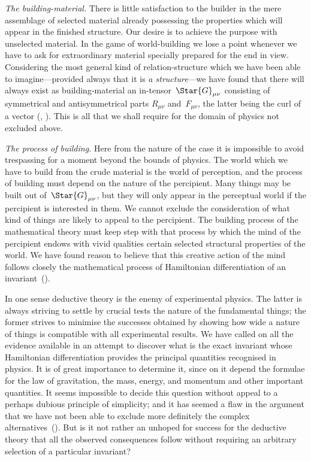 \documentclass[12pt]{book}
\begin{document}
\emph{The building-material.} There is little satisfaction to the builder in the
mere assemblage of selected material already possessing the properties which
will appear in the finished structure. Our desire is to achieve the purpose with
unselected material. In the game of world-building we lose a point whenever
we have to ask for extraordinary material specially prepared for the end in
view. Considering the most general kind of relation-structure which we have
been able to imagine---provided always that it is \emph{a structure}---we have found
that there will always exist as building-material an in-tensor~$\Star{G}_{\mu\nu}$ consisting
of symmetrical and antisymmetrical parts $R_{\mu\nu}$ and~$F_{\mu\nu}$, the latter being the
curl of a vector (, ). This is all that we shall require for the domain of
physics not excluded above.

\emph{The process of building.} Here from the nature of the case it is impossible
to avoid trespassing for a moment beyond the bounds of physics. The world
which we have to build from the crude material is the world of perception, and
the process of building must depend on the nature of the percipient. Many
things may be built out of~$\Star{G}_{\mu\nu}$, but they will only appear in the perceptual
%
world if the percipient is interested in them. We cannot exclude the consideration
of what kind of things are likely to appeal to the percipient. The
building process of the mathematical theory must keep step with that process
by which the mind of the percipient endows with vivid qualities certain
selected structural properties of the world. We have found reason to believe
that this creative action of the mind follows closely the mathematical process
of Hamiltonian differentiation of an invariant~().

In one sense deductive theory is the enemy of experimental physics. The
latter is always striving to settle by crucial tests the nature of the fundamental
things; the former strives to minimise the successes obtained by showing how
wide a nature of things is compatible with all experimental results. We have
called on all the evidence available in an attempt to discover what is the exact
invariant whose Hamiltonian differentiation provides the principal quantities
recognised in physics. It is of great importance to determine it, since on it
depend the formulae for the law of gravitation, the mass, energy, and momentum
and other important quantities. It seems impossible to decide this
question without appeal to a perhaps dubious principle of simplicity; and it
%
%
has seemed a flaw in the argument that we have not been able to exclude
more definitely the complex alternatives~(). But is it not rather an unhoped
for success for the deductive theory that all the observed consequences follow
without requiring an arbitrary selection of a particular invariant?
\end{document}
